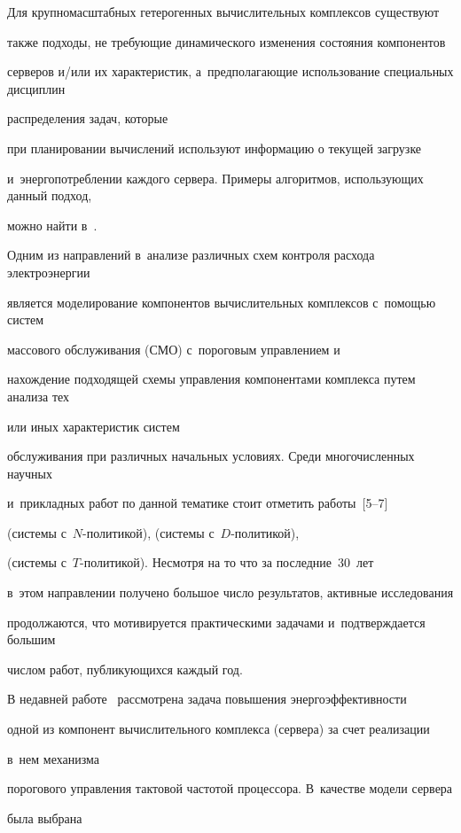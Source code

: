 Для крупномасштабных гетерогенных вычислительных комплексов существуют 

также подходы, не требующие динамического изменения состояния компонентов 

серверов и/или их характеристик, а~предполагающие использование специальных дисциплин 

распределения задач, которые

при планировании вычислений используют информацию о текущей загрузке 

и~энергопотреблении каждого сервера.  Примеры алгоритмов, использующих данный подход, 

можно найти в~\cite{a3, a4}.



Одним из направлений в~анализе различных схем контроля расхода электроэнергии

является моделирование компонентов вычислительных комплексов с~помощью систем

массового обслуживания (СМО) с~пороговым управлением и

нахождение подходящей схемы управления компонентами комплекса путем анализа тех 

или иных характеристик систем

обслуживания при различных начальных условиях. Среди многочисленных научных 

и~прикладных работ по данной тематике стоит отметить работы~[5--7] 

(системы с~$N$-по\-ли\-ти\-кой),  \cite{a10, a11} (системы с~$D$-по\-ли\-ти\-кой),

\cite{a5,a6} (системы с~$T$-по\-ли\-ти\-кой). Несмотря на то что за последние~30~лет 

в~этом направлении получено большое число результатов, активные исследования 

продолжаются, что мотивируется практическими задачами и~подтверждается большим 

числом работ, публикующихся каждый год.



В недавней работе~\cite{a2} рассмотрена задача повышения энергоэффективности

одной из компонент вычислительного комплекса (сервера) за счет реализации 

в~нем механизма

порогового управления тактовой частотой процессора. В~качестве модели сервера 

была выбрана

